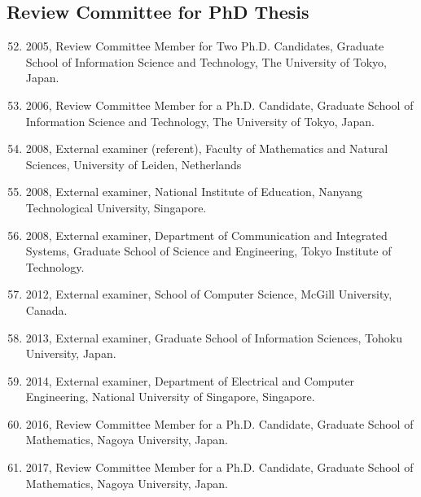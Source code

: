 \subsection{Review Committee for PhD Thesis}
\begin{enumerate}
\setcounter{enumi}{51}
\item 2005, Review Committee Member for Two Ph.D. Candidates, Graduate School of Information Science and Technology, The University of Tokyo, Japan.
\item 2006, Review Committee Member for a Ph.D. Candidate, Graduate School of Information Science and Technology, The University of Tokyo, Japan.
\item 2008, External examiner (referent), Faculty of Mathematics and Natural Sciences, University of Leiden, Netherlands
\item 2008, External examiner, National Institute of Education, Nanyang Technological University, Singapore.
\item 2008, External examiner, Department of Communication and Integrated Systems, Graduate School of Science and Engineering, Tokyo Institute of Technology.
\item 2012, External examiner, School of Computer Science, McGill University, Canada.
\item 2013, External examiner, Graduate School of Information Sciences, Tohoku University, Japan.

\item 2014, External examiner, 
Department of Electrical and Computer Engineering,
National University of Singapore, Singapore.

\item 2016, Review Committee Member for a Ph.D. Candidate, Graduate School of Mathematics, Nagoya University, Japan.

\item 2017, Review Committee Member for a Ph.D. Candidate, Graduate School of Mathematics, Nagoya University, Japan.


\end{enumerate}

